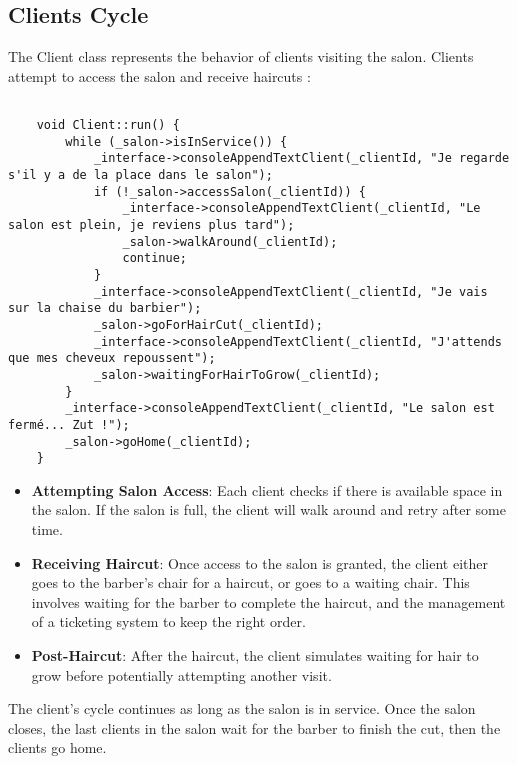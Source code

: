 \documentclass{article}
\begin{document}
    \pagebreak

    \subsection{Clients Cycle}

    The Client class represents the behavior of clients visiting the salon. Clients attempt to access the salon and receive haircuts :

    \begin{lstlisting}[caption={The clients operational cycle}, captionpos=b, label=lst:2]

    void Client::run() {
        while (_salon->isInService()) {
            _interface->consoleAppendTextClient(_clientId, "Je regarde s'il y a de la place dans le salon");
            if (!_salon->accessSalon(_clientId)) {
                _interface->consoleAppendTextClient(_clientId, "Le salon est plein, je reviens plus tard");
                _salon->walkAround(_clientId);
                continue;
            }
            _interface->consoleAppendTextClient(_clientId, "Je vais sur la chaise du barbier");
            _salon->goForHairCut(_clientId);
            _interface->consoleAppendTextClient(_clientId, "J'attends que mes cheveux repoussent");
            _salon->waitingForHairToGrow(_clientId);
        }
        _interface->consoleAppendTextClient(_clientId, "Le salon est fermé... Zut !");
        _salon->goHome(_clientId);
    }

    \end{lstlisting}

    \begin{itemize}
        \item \textbf{Attempting Salon Access}: Each client checks if there is available space in the salon. If the salon is full, the client will walk around and retry after some time.
        \item \textbf{Receiving Haircut}: Once access to the salon is granted, the client either goes to the barber's chair for a haircut, or goes to a waiting chair. This involves waiting for the barber to complete the haircut, and the management of a ticketing system to keep the right order.
        \item \textbf{Post-Haircut}: After the haircut, the client simulates waiting for hair to grow before potentially attempting another visit.
    \end{itemize}

    The client's cycle continues as long as the salon is in service. Once the salon closes, the last clients in the salon wait for the barber to finish the cut, then the clients go home.
\end{document}
